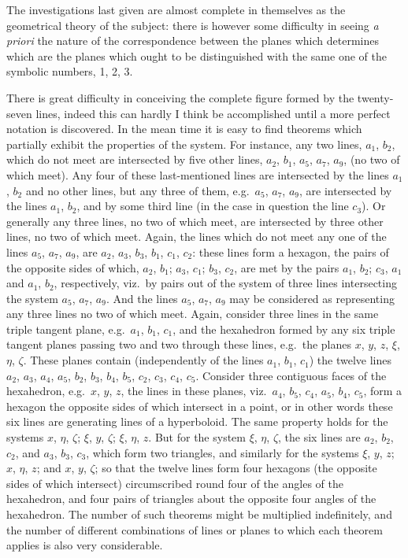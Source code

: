 \documentclass[11pt,a4paper]{book}
\begin{document}
The investigations last given are almost complete in themselves as the geometrical theory of the subject: there is however some difficulty in seeing \textit{a priori} the nature of the correspondence between the planes which determines which are the planes which ought to be distinguished with the same one of the symbolic numbers, 1, 2, 3.

There is great difficulty in conceiving the complete figure formed by the twenty-seven lines, indeed this can hardly I think be accomplished until a more perfect notation is discovered. In the mean time it is easy to find theorems which partially exhibit the properties of the system. For instance, any two lines, $a_1$, $b_2$, which do not meet are intersected by five other lines, $a_2$, $b_1$, $a_5$, $a_7$, $a_9$, (no two of which meet). Any four of these last-mentioned lines are intersected by the lines $a_1$, $b_2$ and no other lines, but any three of them, e.g.\ $a_5$, $a_7$, $a_9$, are intersected by the lines $a_1$, $b_2$, and by some third line (in the case in question the line $c_3$). Or generally any three lines, no two of which meet, are intersected by three other lines, no two of which meet. Again, the lines which do not meet any one of the lines $a_5$, $a_7$, $a_9$, are $a_2$, $a_3$, $b_3$, $b_1$, $c_1$, $c_2$: these lines form a hexagon, the pairs of the opposite sides of which, $a_2$, $b_1$; $a_3$, $c_1$; $b_3$, $c_2$, are met by the pairs $a_1$, $b_2$; $c_3$, $a_1$ and $a_1$, $b_2$, respectively, viz.\ by pairs out of the system of three lines intersecting the system $a_5$, $a_7$, $a_9$. And the lines $a_5$, $a_7$, $a_9$ may be considered as representing any three lines no two of which meet. Again, consider three lines in the same triple tangent plane, e.g.\ $a_1$, $b_1$, $c_1$, and the hexahedron formed by any six triple tangent planes passing two and two through these lines, e.g.\ the planes $x$, $y$, $z$, $\xi$, $\eta$, $\zeta$. These planes contain (independently of the lines $a_1$, $b_1$, $c_1$) the twelve lines $a_2$, $a_3$, $a_4$, $a_5$, $b_2$, $b_3$, $b_4$, $b_5$, $c_2$, $c_3$, $c_4$, $c_5$. Consider three contiguous faces of the hexahedron, e.g.\ $x$, $y$, $z$, the lines in these planes, viz.\ $a_4$, $b_5$, $c_4$, $a_5$, $b_4$, $c_5$, form a hexagon the opposite sides of which intersect in a point, or in other words these six lines are generating lines of a hyperboloid. The same property holds for the systems $x$, $\eta$, $\zeta$; $\xi$, $y$, $\zeta$; $\xi$, $\eta$, $z$. But for the system $\xi$, $\eta$, $\zeta$, the six lines are $a_2$, $b_2$, $c_2$, and $a_3$, $b_3$, $c_3$, which form two triangles, and similarly for the systems $\xi$, $y$, $z$; $x$, $\eta$, $z$; and $x$, $y$, $\zeta$; so that the twelve lines form four hexagons (the opposite sides of which intersect) circumscribed round four of the angles of the hexahedron, and four pairs of triangles about the opposite four angles of the hexahedron. The number of such theorems might be multiplied indefinitely, and the number of different combinations of lines or planes to which each theorem applies is also very considerable.
\end{document}
